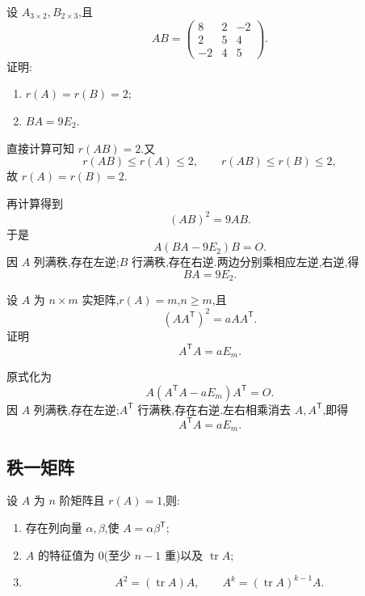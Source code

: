 \begin{example}
设 $A_{3\times2},B_{2\times3}$,且
\[
AB=
\begin{pmatrix}
8&2&-2\\
2&5&4\\
-2&4&5
\end{pmatrix}.
\]
证明:
\begin{enumerate}
  \item $r(A)=r(B)=2$;
  \item $BA=9E_2$.
\end{enumerate}
\end{example}
\exampleblank

\begin{solution}
直接计算可知 $r(AB)=2$.又
\[
 r(AB)\leq r(A)\leq2,
 \qquad
 r(AB)\leq r(B)\leq2,
\]
故 $r(A)=r(B)=2$.

再计算得到
\[
 (AB)^2=9AB.
\]
于是
\[
 A(BA-9E_2)B=O.
\]
因 $A$ 列满秩,存在左逆;$B$ 行满秩,存在右逆.两边分别乘相应左逆,右逆,得
\[
 \boxed{BA=9E_2}.
\]
\end{solution}

\begin{example}
设 $A$ 为 $n\times m$ 实矩阵,$r(A)=m$,$n\geq m$,且
\[
 (AA^{\mathsf T})^2=aAA^{\mathsf T}.
\]
证明
\[
 A^{\mathsf T}A=aE_m.
\]
\end{example}
\exampleblank

\begin{solution}
原式化为
\[
 A(A^{\mathsf T}A-aE_m)A^{\mathsf T}=O.
\]
因 $A$ 列满秩,存在左逆;$A^{\mathsf T}$ 行满秩,存在右逆.左右相乘消去 $A,A^{\mathsf T}$,即得
\[
 \boxed{A^{\mathsf T}A=aE_m}.
\]
\end{solution}

\subsection{秩一矩阵}

\begin{theorem}[\marktwostar]
设 $A$ 为 $n$ 阶矩阵且 $r(A)=1$,则:
\begin{enumerate}
  \item 存在列向量 $\alpha,\beta$,使 $A=\alpha\beta^{\mathsf T}$;
  \item $A$ 的特征值为 $0$(至少 $n-1$ 重)以及 $\operatorname{tr}A$;
  \item
  \[
  A^2=(\operatorname{tr}A)A,
  \qquad
  A^k=(\operatorname{tr}A)^{k-1}A.
  \]
\end{enumerate}
\end{theorem}


